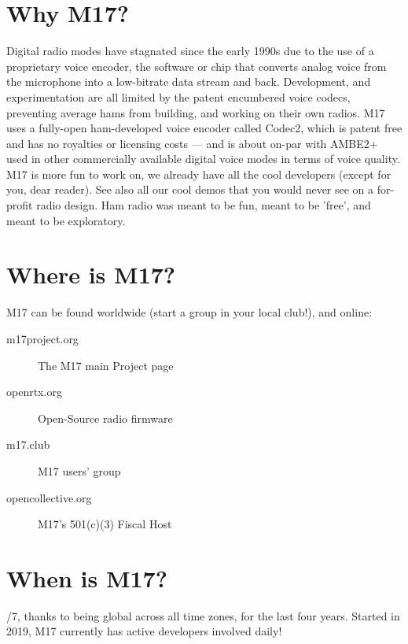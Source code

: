\documentclass[10pt,letterpaper,notitlepage]{article}
\begin{document}
\begin{multicols}{2}
  \section*{Why M17?}
    \justifying
    Digital radio modes have stagnated since the early 1990s due to the use of a proprietary voice encoder, the software or chip that converts analog voice from the microphone into a low-bitrate data stream and back. Development, and experimentation are all limited by the patent encumbered voice codecs, preventing average hams from building, and working on their own radios. M17 uses a fully-open ham-developed voice encoder called Codec2, which is patent free and has no royalties or licensing costs — and is about on-par with AMBE2+ used in other commercially available digital voice modes in terms of voice quality. M17 is more fun to work on, we already have all the cool developers (except for you, dear reader). See also all our cool demos that you would never see on a for-profit radio design. Ham radio was meant to be fun, meant to be ’free’, and meant to be exploratory.
  \section*{Where is M17?}
    \justifying
    M17 can be found worldwide (start a group in your local club!), and online:
    \begin{description}
      \item[m17project.org] The M17 main Project page
      \item[openrtx.org] Open-Source radio firmware
      \item[m17.club] M17 users’ group
      \item[opencollective.org] M17’s 501(c)(3) Fiscal Host    
    \end{description}
  \section*{When is M17?}
    /7, thanks to being global across all time zones, for the last four years. Started in 2019, M17 currently has active developers involved daily!
  \end{multicols}
  \bigskip
\end{document}
